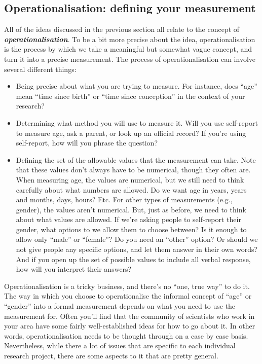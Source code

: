 \documentclass[
]{book}
\providecommand{\tightlist}{%
  \setlength{\itemsep}{0pt}\setlength{\parskip}{0pt}}
\begin{document}
\hypertarget{operationalisation-defining-your-measurement}{%
\subsection{Operationalisation: defining your measurement}\label{operationalisation-defining-your-measurement}}

All of the ideas discussed in the previous section all relate to the concept of \textbf{\emph{operationalisation}}. To be a bit more precise about the idea, operationalisation is the process by which we take a meaningful but somewhat vague concept, and turn it into a precise measurement. The process of operationalisation can involve several different things:

\begin{itemize}
\tightlist
\item
  Being precise about what you are trying to measure. For instance, does ``age'' mean ``time since birth'' or ``time since conception'' in the context of your research?
\item
  Determining what method you will use to measure it. Will you use self-report to measure age, ask a parent, or look up an official record? If you're using self-report, how will you phrase the question?
\item
  Defining the set of the allowable values that the measurement can take. Note that these values don't always have to be numerical, though they often are. When measuring age, the values are numerical, but we still need to think carefully about what numbers are allowed. Do we want age in years, years and months, days, hours? Etc. For other types of measurements (e.g., gender), the values aren't numerical. But, just as before, we need to think about what values are allowed. If we're asking people to self-report their gender, what options to we allow them to choose between? Is it enough to allow only ``male'' or ``female''? Do you need an ``other'' option? Or should we not give people any specific options, and let them answer in their own words? And if you open up the set of possible values to include all verbal response, how will you interpret their answers?
\end{itemize}

Operationalisation is a tricky business, and there's no ``one, true way'' to do it. The way in which you choose to operationalise the informal concept of ``age'' or ``gender'' into a formal measurement depends on what you need to use the measurement for. Often you'll find that the community of scientists who work in your area have some fairly well-established ideas for how to go about it. In other words, operationalisation needs to be thought through on a case by case basis. Nevertheless, while there a lot of issues that are specific to each individual research project, there are some aspects to it that are pretty general.
\end{document}
